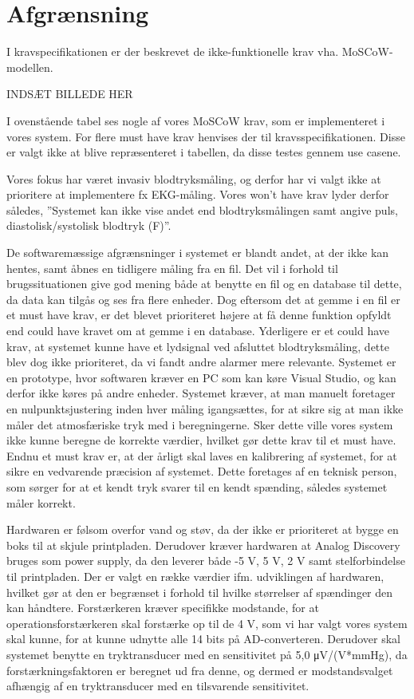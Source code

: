 \section{Afgrænsning}
I kravspecifikationen er der beskrevet de ikke-funktionelle krav vha. MoSCoW- modellen. 

INDSÆT BILLEDE HER

I ovenstående tabel ses nogle af vores MoSCoW krav, som er implementeret i vores system. For flere must have krav henvises der til kravsspecifikationen. Disse er valgt ikke at blive repræsenteret i tabellen, da disse testes gennem use casene.

Vores fokus har været invasiv blodtryksmåling, og derfor har vi valgt ikke at prioritere at
implementere fx EKG-måling. Vores won't have krav lyder derfor således, ”Systemet kan ikke
vise andet end blodtryksmålingen samt angive puls, diastolisk/systolisk blodtryk (F)”.


De softwaremæssige afgrænsninger i systemet er blandt andet, at der ikke kan hentes, samt åbnes
en tidligere måling fra en fil. Det vil i forhold til brugssituationen give god mening både at benytte en fil og en database til dette, da data kan tilgås og ses fra flere enheder. Dog eftersom det at gemme i en fil er et must have krav, er det blevet prioriteret højere at få denne funktion opfyldt end could have kravet om at gemme i en database. \newline
Yderligere er et could have krav, at systemet kunne have et lydsignal ved afsluttet blodtryksmåling, dette blev dog ikke prioriteret, da vi fandt andre alarmer mere relevante.
Systemet er en prototype, hvor softwaren kræver en PC som kan køre Visual Studio, og kan derfor ikke køres på andre enheder. \newline
Systemet kræver, at man manuelt foretager en nulpunktsjustering inden hver måling igangsættes, for at sikre sig at man ikke måler det atmosfæriske tryk med i beregningerne. Sker dette ville vores system ikke kunne beregne de korrekte værdier, hvilket gør dette krav til et must have. Endnu et must krav er, at der årligt skal laves en kalibrering af systemet, for at sikre en vedvarende præcision af systemet. Dette foretages af en teknisk person, som sørger for at et kendt tryk svarer til en kendt spænding, således systemet måler korrekt.


Hardwaren er følsom overfor vand og støv, da der ikke er prioriteret at bygge en boks til at skjule printpladen. Derudover kræver hardwaren at Analog Discovery bruges som power supply, da den leverer både -5 V, 5 V, 2 V samt stelforbindelse til printpladen. \newline
Der er valgt en række værdier ifm. udviklingen af hardwaren, hvilket gør at den er begrænset
i forhold til hvilke størrelser af spændinger den kan håndtere. Forstærkeren kræver specifikke
modstande, for at operationsforstærkeren skal forstærke op til de 4 V, som vi har valgt vores
system skal kunne, for at kunne udnytte alle 14 bits på AD-converteren. \newline
Derudover skal systemet benytte en tryktransducer med en sensitivitet på 5,0 μV/(V*mmHg), da forstærkningsfaktoren er beregnet ud fra denne, og dermed er modstandsvalget afhængig af en tryktransducer med en tilsvarende sensitivitet.

\clearpage